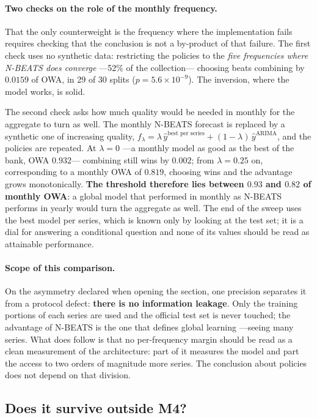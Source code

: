 \paragraph{Two checks on the role of the monthly frequency.} That the only counterweight
is the frequency where the implementation fails requires checking that the conclusion is
not a by-product of that failure. The first check uses no synthetic data: restricting the
policies to the \emph{five frequencies where N-BEATS does converge} ---52\% of the
collection--- choosing beats combining by $0.0159$ of OWA, in 29 of 30 splits
($p=5.6\times10^{-9}$). The inversion, where the model works, is solid.

The second check asks how much quality would be needed in monthly for the aggregate to
turn as well. The monthly N-BEATS forecast is replaced by a synthetic one of increasing
quality, $f_\lambda = \lambda\,\hat{y}^{\text{best per series}} + (1-\lambda)\,
\hat{y}^{\text{ARIMA}}$, and the policies are repeated. At $\lambda=0$ ---a monthly model
as good as the best of the bank, OWA $0.932$--- combining still wins by $0.002$; from
$\lambda=0.25$ on, corresponding to a monthly OWA of $0.819$, choosing wins and the
advantage grows monotonically. \textbf{The threshold therefore lies between $0.93$ and
$0.82$ of monthly OWA}: a global model that performed in monthly as N-BEATS performs in
yearly would turn the aggregate as well. The end of the sweep uses the best model per
series, which is known only by looking at the test set; it is a dial for answering a
conditional question and none of its values should be read as attainable performance.

\paragraph{Scope of this comparison.} On the asymmetry declared when opening the section,
one precision separates it from a protocol defect: \textbf{there is no information
leakage}. Only the training portions of each series are used and the official test set is
never touched; the advantage of N-BEATS is the one that defines global learning ---seeing
many series. What does follow is that no per-frequency margin should be read as a clean
measurement of the architecture: part of it measures the model and part the access to two
orders of magnitude more series. The conclusion about policies does not depend on that
division.

\subsection{Does it survive outside M4?}\label{sec:m3}

